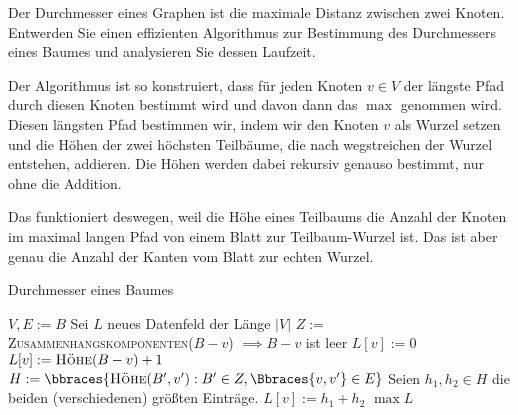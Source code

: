 
\begin{exercise}

Der Durchmesser eines Graphen ist die maximale Distanz zwischen zwei Knoten.
Entwerden Sie einen effizienten Algorithmus zur Bestimmung des Durchmessers
eines Baumes und analysieren Sie dessen Laufzeit.

\end{exercise}


\begin{solution}

Der Algorithmus ist so konstruiert, dass für jeden Knoten $v \in V$ der längste Pfad durch diesen Knoten bestimmt wird und davon dann das $\max$ genommen wird.
Diesen längsten Pfad bestimmen wir, indem wir den Knoten $v$ als Wurzel setzen und die Höhen der zwei höchsten Teilbäume, die nach wegstreichen der Wurzel entstehen, addieren.
Die Höhen werden dabei rekursiv genauso bestimmt, nur ohne die Addition.

Das funktioniert deswegen, weil die Höhe eines Teilbaums die Anzahl der Knoten im maximal langen Pfad von einem Blatt zur Teilbaum-Wurzel ist.
Das ist aber genau die Anzahl der Kanten vom Blatt zur echten Wurzel.

\pagebreak

\begin{algorithm}
  \caption{Durchmesser eines Baumes}
  \begin{algorithmic}[1]
      \State $V, E := B$
      \State Sei $L$ neues Datenfeld der Länge $|V|$
          \State $Z :=$ \textsc{Zusammenhangskomponenten}($B - v$)
           $\implies B-v$ ist leer
            \State $L[v] := 0$
            \State $L[v] := \textsc{Höhe}(B - v) + 1$
            \State $H := \bbraces{\textsc{Höhe}(B^\prime, v^\prime): B^\prime \in Z, \Bbraces{v, v^\prime} \in E}$
            \State Seien $h_1, h_2 \in H$ die beiden (verschiedenen) größten Einträge.
            \State $L[v] := h_1 + h_2$
          \EndIf
        \EndFor
      \State \Return $\max L$
    \EndProcedure
  \end{algorithmic}
\end{algorithm}


\end{solution}
